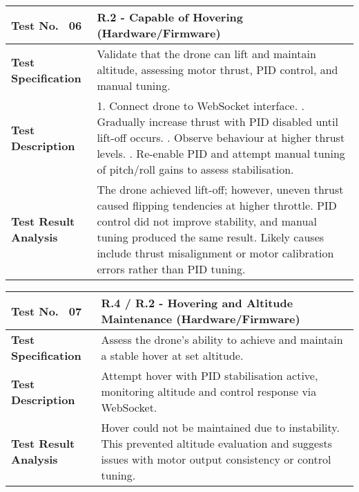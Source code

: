 \begin{table}[H]
\centering
\renewcommand{\arraystretch}{1.2}
\begin{tabular}{|p{3.5cm}|p{12cm}|}
\hline
\textbf{Test No. \, 06} & \textbf{R.2 - Capable of Hovering} (Hardware/Firmware) \\ \hline
\textbf{Test Specification} & 
Validate that the drone can lift and maintain altitude, assessing motor thrust, PID control, and manual tuning. \\ \hline
\textbf{Test Description} & 
1. Connect drone to WebSocket interface. \newline
2. Gradually increase thrust with PID disabled until lift-off occurs. \newline
3. Observe behaviour at higher thrust levels. \newline
4. Re-enable PID and attempt manual tuning of pitch/roll gains to assess stabilisation. \\ \hline
\textbf{Test Result Analysis} & 
The drone achieved lift-off; however, uneven thrust caused flipping tendencies at higher throttle. PID control did not improve stability, and manual tuning produced the same result. Likely causes include thrust misalignment or motor calibration errors rather than PID tuning. \\ \hline
\end{tabular}
\end{table}

\begin{table}[H]
\centering
\renewcommand{\arraystretch}{1.2}
\begin{tabular}{|p{3.5cm}|p{12cm}|}
\hline
\textbf{Test No. \, 07} & \textbf{R.4 / R.2 - Hovering and Altitude Maintenance} (Hardware/Firmware) \\ \hline
\textbf{Test Specification} & 
Assess the drone's ability to achieve and maintain a stable hover at set altitude. \\ \hline
\textbf{Test Description} & 
Attempt hover with PID stabilisation active, monitoring altitude and control response via WebSocket. \\ \hline
\textbf{Test Result Analysis} & 
Hover could not be maintained due to instability. This prevented altitude evaluation and suggests issues with motor output consistency or control tuning. \\ \hline
\end{tabular}
\end{table}

